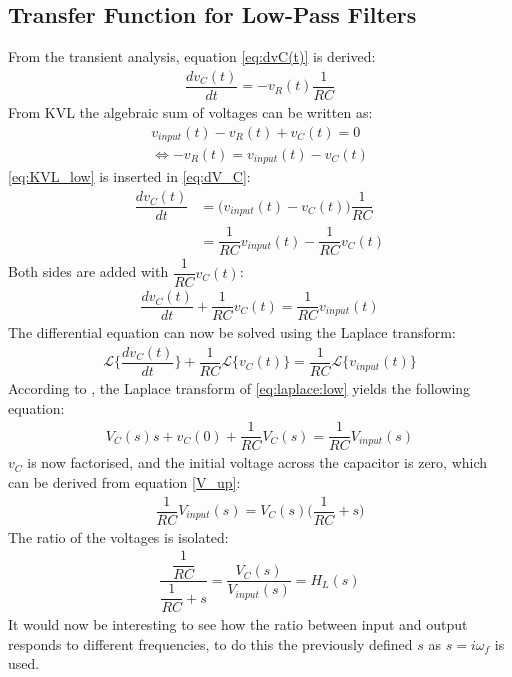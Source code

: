 \subsection{Transfer Function for Low-Pass Filters}
From the transient analysis, equation \eqref{eq:dvC(t)} is derived:
\begin{align} \label{eq:dV_C}
\dfrac{dv_C(t)}{dt}=-v_R(t)\dfrac{1}{RC}
\end{align}
From KVL the algebraic sum of voltages can be written as: 
\begin{align}
v_{input}(t)-v_{R}(t)+v_{C}(t)=0
\\
\Leftrightarrow -v_{R}(t) = v_{input}(t) - v_{C}(t) \label{eq:KVL_low}
\end{align}
\eqref{eq:KVL_low} is inserted in \eqref{eq:dV_C}:
\begin{align} 
\dfrac{dv_C(t)}{dt}&=\Big(v_{input}(t) - v_{C}(t)\Big)\dfrac{1}{RC}
\\
&=\dfrac{1}{RC}v_{input}(t) - \dfrac{1}{RC}v_{C}(t)
\end{align}
Both sides are added with $\dfrac{1}{RC}v_C(t)$:
\begin{align}
\dfrac{dv_C(t)}{dt}+\dfrac{1}{RC}v_C(t)=\dfrac{1}{RC}v_{input}(t)
\end{align}
The differential equation can now be solved using the Laplace transform:
\begin{align}\label{eq:laplace:low}\mathcal{L}\bigg\{\dfrac{dv_C(t)}{dt}\bigg\}+\dfrac{1}{RC}\mathcal{L}\Big\{v_C(t)\Big\}=\dfrac{1}{RC}\mathcal{L}\Big\{v_{input}(t)\Big\}
\end{align}
According to , the Laplace transform of \eqref{eq:laplace:low} yields the following equation:
\begin{align}
V_C(s)s+v_C(0)+\dfrac{1}{RC}V_C(s)=\dfrac{1}{RC}V_{input}(s)
\end{align} 
$v_{C}$ is now factorised, and the initial voltage across the capacitor is zero, which can be derived from equation \eqref{V_up}:
\begin{align}
\dfrac{1}{RC}V_{input}(s)=V_{C}(s)\Big(\dfrac{1}{RC}+s\Big)
\end{align} 
The ratio of the voltages is isolated:
\begin{align}
\dfrac{\dfrac{1}{RC}}{\dfrac{1}{RC}+s} = \dfrac{V_{C}(s)}{V_{input}(s)}=H_L(s)
\end{align}
It would now be interesting to see how the ratio between input and output responds to different frequencies, to do this the previously defined $s$ as $s=i\omega_f$ is used.
